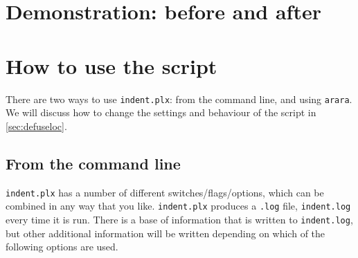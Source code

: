 \documentclass[11pt]{article}
\begin{document}
\section{Demonstration: before and after}

\section{How to use the script}
There are two ways to use \lstinline!indent.plx!: from the command line, 
and using \lstinline!arara!.  We will discuss how to change the settings and behaviour 
of the script in \cref{sec:defuseloc}.

\subsection{From the command line}\label{sec:commandline}
\lstinline!indent.plx! has a number of different switches/flags/options, which 
can be combined in any way that you like. \lstinline!indent.plx! 
produces a \lstinline!.log! file, \lstinline!indent.log! every time it
is run. There is a base of information that is written to \lstinline!indent.log!,
but other additional information will be written depending 
on which of the following options are used.
\end{document}
